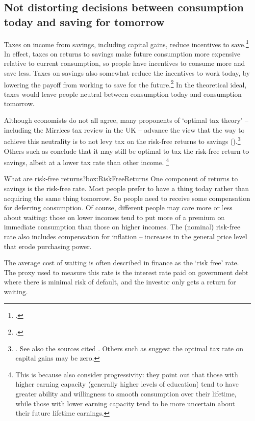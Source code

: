 \subsection{Not distorting decisions between consumption today and saving for tomorrow}
Taxes on income from savings, including capital gains, reduce incentives to save.\footcites[][32]{HenryTaxReview2010}[][58]{Treasury2015ReThink}[][295]{MirrleesAdamBesleyEtAl2011}  In effect, taxes on returns to savings make future consumption more expensive relative to current consumption, so people have incentives to consume more and save less. Taxes on savings also somewhat reduce the incentives to work today, by lowering the payoff from working to save for the future.\footcite[][12]{HenryTaxReview2010}  In the theoretical ideal, taxes would leave people neutral between consumption today and consumption tomorrow.

Although economists do not all agree, many proponents of ‘optimal tax theory’ – including the Mirrlees tax review in the UK  – advance the view that the way to achieve this neutrality is to not levy tax on the risk-free returns to savings ().\footnote{\textcite[][284]{MirrleesAdamBesleyEtAl2011}. See also the sources cited \textcite[][2]{Ingles2015}. Others such as \textcite[][1]{Carling2015} suggest the optimal tax rate on capital gains may be zero.} 
Others such as \textcite{BanksDiamond2008}\DEVIATION{} %
conclude that it may still be optimal to tax the risk-free return to savings, albeit at a lower tax rate than other income.%
\footnote{This is because \textcite{BanksDiamond2008} also consider progressivity: they point out that those with higher earning capacity (generally higher levels of education) tend to have greater ability and willingness to smooth consumption over their lifetime, while those with lower earning capacity tend to be more uncertain about their future lifetime earnings.}  

\begin{smallbox}[tbp]{What are risk-free returns?}{box:RiskFreeReturns}
One component of returns to savings is the risk-free rate. Most people prefer to have a thing today rather than acquiring the same thing tomorrow. So people need to receive some compensation for deferring consumption. Of course, different people may care more or less about waiting: those on lower incomes tend to put more of a premium on immediate consumption than those on higher incomes.   The (nominal) risk-free rate also includes compensation for inflation – increases in the general price level that erode purchasing power. 

The average cost of waiting is often described in finance as the ‘risk free’ rate. The proxy used to measure this rate is the interest rate paid on government debt where there is minimal risk of default, and the investor only gets a return for waiting. 
\end{smallbox}

